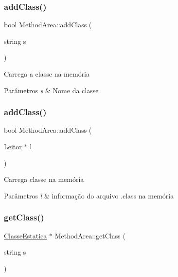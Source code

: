 \subsubsection{\texorpdfstring{add\+Class()}{addClass()}\hspace{0.1cm}{\footnotesize\ttfamily [1/2]}}
{\footnotesize\ttfamily bool Method\+Area\+::add\+Class (\begin{DoxyParamCaption}\item[{string}]{s }\end{DoxyParamCaption})\hspace{0.3cm}{\ttfamily [static]}}

Carrega a classe na memória


\begin{DoxyParams}{Parâmetros}
{\em s} & Nome da classe \\
\hline
\end{DoxyParams}
\mbox{\label{classMethodArea_a8f781122a775565f9d99ec5603e4f432}} 
\subsubsection{\texorpdfstring{add\+Class()}{addClass()}\hspace{0.1cm}{\footnotesize\ttfamily [2/2]}}
{\footnotesize\ttfamily bool Method\+Area\+::add\+Class (\begin{DoxyParamCaption}\item[{\hyperlink{classLeitor}{Leitor} $\ast$}]{l }\end{DoxyParamCaption})\hspace{0.3cm}{\ttfamily [static]}}

Carrega classe na memória


\begin{DoxyParams}{Parâmetros}
{\em l} & informação do arquivo .class na memória \\
\hline
\end{DoxyParams}
\mbox{\label{classMethodArea_a81670949394fd7400fe8c006d010385e}} 
\subsubsection{\texorpdfstring{get\+Class()}{getClass()}}
{\footnotesize\ttfamily \hyperlink{classClasseEstatica}{Classe\+Estatica} $\ast$ Method\+Area\+::get\+Class (\begin{DoxyParamCaption}\item[{string}]{s }\end{DoxyParamCaption})\hspace{0.3cm}{\ttfamily [static]}}

